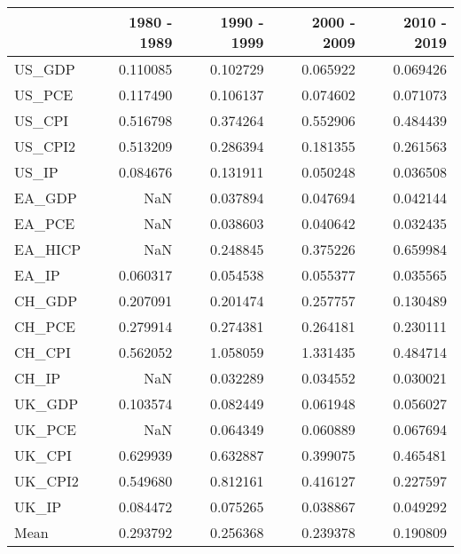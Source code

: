 \begin{tabular}{lrrrr}
\toprule
{} &  1980 - 1989 &  1990 - 1999 &  2000 - 2009 &  2010 - 2019 \\
\midrule
US\_GDP  &     0.110085 &     0.102729 &     0.065922 &     0.069426 \\
US\_PCE  &     0.117490 &     0.106137 &     0.074602 &     0.071073 \\
US\_CPI  &     0.516798 &     0.374264 &     0.552906 &     0.484439 \\
US\_CPI2 &     0.513209 &     0.286394 &     0.181355 &     0.261563 \\
US\_IP   &     0.084676 &     0.131911 &     0.050248 &     0.036508 \\
EA\_GDP  &          NaN &     0.037894 &     0.047694 &     0.042144 \\
EA\_PCE  &          NaN &     0.038603 &     0.040642 &     0.032435 \\
EA\_HICP &          NaN &     0.248845 &     0.375226 &     0.659984 \\
EA\_IP   &     0.060317 &     0.054538 &     0.055377 &     0.035565 \\
CH\_GDP  &     0.207091 &     0.201474 &     0.257757 &     0.130489 \\
CH\_PCE  &     0.279914 &     0.274381 &     0.264181 &     0.230111 \\
CH\_CPI  &     0.562052 &     1.058059 &     1.331435 &     0.484714 \\
CH\_IP   &          NaN &     0.032289 &     0.034552 &     0.030021 \\
UK\_GDP  &     0.103574 &     0.082449 &     0.061948 &     0.056027 \\
UK\_PCE  &          NaN &     0.064349 &     0.060889 &     0.067694 \\
UK\_CPI  &     0.629939 &     0.632887 &     0.399075 &     0.465481 \\
UK\_CPI2 &     0.549680 &     0.812161 &     0.416127 &     0.227597 \\
UK\_IP   &     0.084472 &     0.075265 &     0.038867 &     0.049292 \\
Mean    &     0.293792 &     0.256368 &     0.239378 &     0.190809 \\
\bottomrule
\end{tabular}
